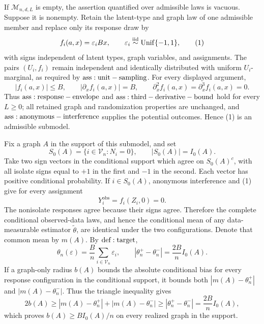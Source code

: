 If \(\mathcal M_{n,d,L}\) is empty, the assertion quantified over admissible laws is vacuous.  Suppose it is nonempty.  Retain the latent-type and graph law of one admissible member and replace only its response draw by
\[
 f_i(a,x)=\varepsilon_iBx,
 \qquad \varepsilon_i\overset{\mathrm{iid}}{\sim}{\rm Unif}\{-1,1\},
\tag{1}
\]
with signs independent of latent types, graph variables, and assignments.  The pairs \((U_i,f_i)\) remain independent and identically distributed with uniform \(U_i\)-marginal, as required by \({\rm ass:unit-sampling}\).  For every displayed argument,
\[
 |f_i(a,x)|\leq B,
 \qquad |\partial_xf_i(a,x)|=B,
 \qquad \partial_x^2f_i(a,x)=\partial_x^3f_i(a,x)=0.
\tag{2}
\]
Thus \({\rm ass:response-envelope}\) and \({\rm ass:third-derivative-bound}\) hold for every \(L\geq0\); all retained graph and randomization properties are unchanged, and \({\rm ass:anonymous-interference}\) supplies the potential outcomes.  Hence (1) is an admissible submodel.

Fix a graph \(A\) in the support of this submodel, and set
\[
 S_0(A)=\{i\in\mathcal V_n:N_i=0\},
 \qquad |S_0(A)|=I_0(A).
\tag{3}
\]
Take two sign vectors in the conditional support which agree on \(S_0(A)^c\), with all isolate signs equal to \(+1\) in the first and \(-1\) in the second.  Each vector has positive conditional probability.  If \(i\in S_0(A)\), anonymous interference and (1) give for every assignment
\[
 Y_i^{\mathrm{obs}}=f_i(Z_i,0)=0.
\tag{4}
\]
The nonisolate responses agree because their signs agree.  Therefore the complete conditional observed-data laws, and hence the conditional mean of any data-measurable estimator \(\widetilde\theta\), are identical under the two configurations.  Denote that common mean by \(m(A)\).  By \({\rm def:target}\),
\[
 \theta_n(\varepsilon)=\frac Bn\sum_{i\in\mathcal V_n}\varepsilon_i,
 \qquad |\theta_n^+-\theta_n^-|=\frac{2B}{n}I_0(A).
\tag{5}
\]
If a graph-only radius \(b(A)\) bounds the absolute conditional bias for every response configuration in the conditional support, it bounds both \(|m(A)-\theta_n^+|\) and \(|m(A)-\theta_n^-|\).  Thus the triangle inequality gives
\[
 2b(A)\geq|m(A)-\theta_n^+|+|m(A)-\theta_n^-|
 \geq|\theta_n^+-\theta_n^-|=\frac{2B}{n}I_0(A),
\]
which proves \(b(A)\geq BI_0(A)/n\) on every realized graph in the support.

